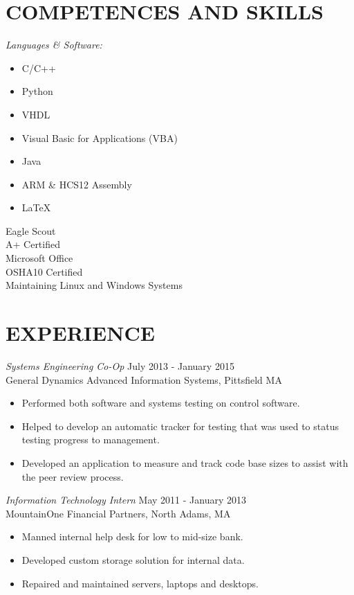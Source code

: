 \documentclass[line,margin]{res}
\begin{document}
\begin{resume}
\section{COMPETENCES AND SKILLS} {\sl Languages \& Software:} %
	\begin{multicols}{2}
		\begin{itemize}
			\itemsep -2pt
			\item[] C/C++
			\item[] Python
			\item[] VHDL
			\item[] Visual Basic for Applications (VBA)
			\item[] Java
			\item[] ARM \& HCS12 Assembly
			\item[] \LaTeX 
		\end{itemize}
	\end{multicols}
	Eagle Scout\\
	A+ Certified\\
	Microsoft Office\\
	OSHA10 Certified\\
	Maintaining Linux and Windows Systems
\section{EXPERIENCE} 
	{\sl Systems Engineering Co-Op} \hfill July 2013 - January 2015 \\
	General Dynamics Advanced Information Systems, Pittsfield MA
	\begin{itemize}  \itemsep -2pt %
			\item Performed both software and systems testing on 
				control software. 
			\item Helped to develop an automatic tracker for
				testing that was used to status testing progress
				to management. 
			\item Developed an application to measure and track 
				code base sizes to assist with the peer review process.
	\end{itemize}
 
	{\sl Information Technology Intern} \hfill May 2011 - January 2013 \\
		MountainOne Financial Partners, North Adams, MA
		\begin{itemize}  \itemsep -2pt %
			\item Manned internal help desk for low to mid-size bank.
			\item Developed custom storage solution for internal data.
			\item Repaired and maintained servers, laptops and desktops. 
		\end{itemize} 


\end{resume}
\end{document}
